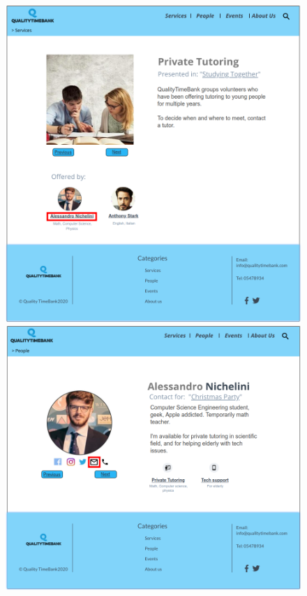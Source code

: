 \documentclass[a4paper, 11pt, parskip=half, headsepline]{scrreprt}
\begin{document}
\begin{figure}[H]
    \begin{minipage}[t]{0.5\textwidth}
        \centering
    	\includegraphics[width=1\linewidth, keepaspectratio]{scenarios/scenario-13}
    	\caption{}
    	\label{fig:scenario-13}
    \end{minipage}
    \hspace*{\fill}
    \begin{minipage}[t]{0.5\textwidth}
        \centering
    	\includegraphics[width=1\linewidth, keepaspectratio]{scenarios/scenario-14}
    	\caption{}
    	\label{fig:scenario-14}
    \end{minipage}
\end{figure}
\end{document}
